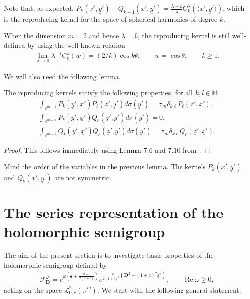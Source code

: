 \documentclass[pdftex]{sigma}
\numberwithin{equation}{section}
\numberwithin{theorem}{section}
\numberwithin{proposition}{section}
\numberwithin{lemma}{section}
\numberwithin{corollary}{section}
\numberwithin{definition}{section}
\numberwithin{example}{section}
\numberwithin{remark}{section}
\numberwithin{note}{section}
\theoremstyle{remark}
\newcommand{\mR}{\mathbb{R}}
\newcommand{\mN}{\mathbb{N}}
\newcommand{\mS}{\mathbb{S}}
\newcommand{\cF}{\mathcal{F}}
\newcommand{\cL}{\mathcal{L}}
\newcommand{\dD}{\textbf{D}}
\newcommand{\ux}{\underline{x}}
\newcommand{\uz}{\underline{z}}
\newcommand{\uy}{\underline{y}}
\def\l{{\lambda}}
\def\o{{\omega}}
\def\s{{\sigma}}
\def\la{{\langle}}
\def\ra{{\rangle}}
\begin{document}
\begin{remark}
Note that, as expected, $P_{k}(\ux',\uy')+Q_{k-1}(\ux',\uy')=
\frac{\l+k}{\l}C_{k}^{\l}(\la\ux',\uy'\ra)$, which is the reproducing kernel for the space of
spherical harmonics of degree $k$.
\end{remark}

\begin{remark}
When the dimension $m=2$ and hence $\lambda=0$, the reproducing kernel is still well-def\/ined by
using the well-known relation~\cite[(4.7.8)]{Sz}
\begin{gather*}
\lim_{\lambda\rightarrow0}\lambda^{-1}C_k^\lambda(w)=(2/k)\cos k\theta,\qquad w=\cos
\theta,\qquad k\geq1.
\end{gather*}
\end{remark}

We will also need the following lemma.

\begin{lemma}
\label{ReprKernOrth}
The reproducing kernels satisfy the following properties, for all $k,l\in\mN$:
\begin{gather*}
\int_{\mS^{m-1}} P_{k}(\uy', \ux') P_{\ell}(\uz', \uy') d \s (\uy') = \sigma_m \delta_{k \ell
}P_{\ell}( \uz', \ux'),\\
\int_{\mS^{m-1}} P_{k}( \uy', \ux') Q_{\ell}( \uz', \uy') d \s (\uy') = 0,\\
\int_{\mS^{m-1}} Q_{k}( \uy', \ux') Q_{\ell}(\uz', \uy') d \s (\uy') = \sigma_m \delta_{k \ell }
Q_{\ell}(\uz', \ux').
\end{gather*}
\end{lemma}

\begin{proof}
This follows immediately using Lemma 7.6 and 7.10 from~\cite{DBXu}.
\end{proof}

\begin{remark}
Mind the order of the variables in the previous lemma.
The kernels $P_{k}(\ux',\uy')$ and $Q_{k}(\ux',\uy')$ are not symmetric.
\end{remark}

\section{The series representation of the holomorphic semigroup}\label{section6}

The aim of the present section is to investigate basic properties of the holomorphic semigroup
def\/ined by
\begin{gather*}
\cF_{\dD}^{\o}=e^{\o\left(\frac{1}{2}+\frac{\mu-1}{2(1+c)}\right)}e^{\frac{-\o}{
2(1+c)^{2}}\left(\dD^{2}-(1+c)^{2}\ux^{2}\right)},\qquad\operatorname{Re}\o\geq0,
\end{gather*}
acting on the space $\cL^{2}_{0,c}(\mR^{m})$.
We start with the following general statement.
\end{document}
